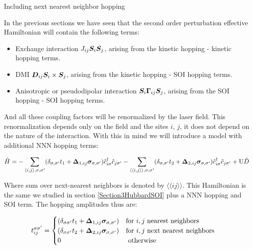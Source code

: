 \begin{section}{Including next nearest neighbor hopping}

In the previous sections we have seen that the second order perturbation effective Hamiltonian will contain the following terms:

\begin{itemize}
	\item Exchange interaction $J_{ij} \boldsymbol{S}_i \boldsymbol{S}_j$, arising from the kinetic hopping - kinetic hopping terms.
	\item DMI $\boldsymbol{D}_{ij} \boldsymbol{S}_i \times \boldsymbol{S}_j$, arising from the kinetic hopping - SOI hopping terms.
	\item Anisotropic or pseudodipolar interaction $\boldsymbol{S}_i \boldsymbol{\Gamma}_{ij} \boldsymbol{S}_j$, arising from the SOI hopping - SOI hopping terms.
\end{itemize}

And all these coupling factors will be renormalized by the laser field. This renormalization depends only on the field and the sites $i$, $j$, it does not depend on the nature of the interaction. With this in mind we will introduce a model with additional NNN hopping terms: 

\begin{equation}
\label{BigHam}
\hat{H} = -\sum_{\langle i,j \rangle, \sigma, \sigma'}(\delta_{\sigma, \sigma'} t_1 + \boldsymbol{\Delta}_{1,ij} \boldsymbol{\sigma}_{\sigma, \sigma'})\hat{c}_{i \sigma}^\dagger \hat{c}_{j \sigma'} - 
	\sum_{\langle \langle i,j \rangle \rangle, \sigma, \sigma'}(\delta_{\sigma, \sigma'} t_2 + \boldsymbol{\Delta}_{2,ij} \boldsymbol{\sigma}_{\sigma, \sigma'})\hat{c}_{i \sigma}^\dagger \hat{c}_{j \sigma'} + 
	\text{U}\hat{D}
\end{equation}

Where sum over next-nearest neighbors is denoted by $\langle \langle i j \rangle \rangle$. This Hamiltonian is the same we studied in section \ref{Section3HubbardSOI} plus a NNN hopping and SOI term. The hopping amplitudes thus are:

\begin{equation}
t_{ij}^{\sigma \sigma'} = \begin{cases}
	(\delta_{\sigma \sigma'}t_1+\boldsymbol{\Delta}_{1,ij} \boldsymbol{\sigma}_{\sigma, \sigma'}) & \text{for } i, j \text{ nearest neighbors} \\
	(\delta_{\sigma \sigma'}t_2+\boldsymbol{\Delta}_{2,ij} \boldsymbol{\sigma}_{\sigma, \sigma'}) & \text{for } i, j \text{ next nearest neighbors} \\
	0 & \text{ otherwise}
\end{cases} \quad
\end{equation}


\end{section}
